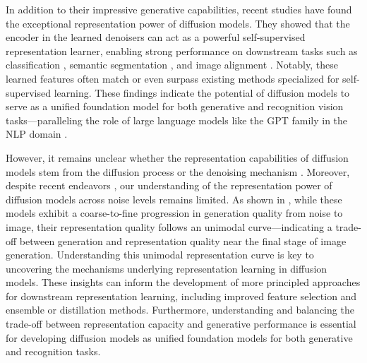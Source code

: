 In addition to their impressive generative capabilities, recent studies \citep{baranchuk2021label,xiang2023denoising,mukhopadhyay2023diffusion,chen2024deconstructing,tang2023emergent,han2024feature} have found the exceptional representation power of diffusion models.
They showed that the encoder in the learned denoisers can act as a powerful self-supervised representation learner, enabling strong performance on downstream tasks such as classification \citep{xiang2023denoising,mukhopadhyay2023diffusion}, semantic segmentation \citep{baranchuk2021label}, and image alignment \citep{tang2023emergent}. Notably, these learned features often match or even surpass existing methods specialized for self-supervised learning. These findings indicate the potential of diffusion models to serve as a unified foundation model for both generative and recognition vision tasks—paralleling the role of large language models like the GPT family in the NLP domain \citep{radford2019language,achiam2023gpt}. 

However, it remains unclear whether the representation capabilities of diffusion models stem from the diffusion process or the denoising mechanism \citep{fuest2024diffusion}. Moreover, despite recent endeavors \citep{chen2024deconstructing,han2024feature}, our understanding of the representation power of diffusion models across noise levels remains limited. As shown in \citet{baranchuk2021label, xiang2023denoising,tang2023emergent}, while these models exhibit a coarse-to-fine progression in generation quality from noise to image, their representation quality follows an unimodal curve—indicating a trade-off between generation and representation quality near the final stage of image generation. Understanding this unimodal representation curve is key to uncovering the mechanisms underlying representation learning in diffusion models. These insights can inform the development of more principled approaches for downstream representation learning, including improved feature selection and ensemble or distillation methods. Furthermore, understanding and balancing the trade-off between representation capacity and generative performance is essential for developing diffusion models as unified foundation models for both generative and recognition tasks. 

